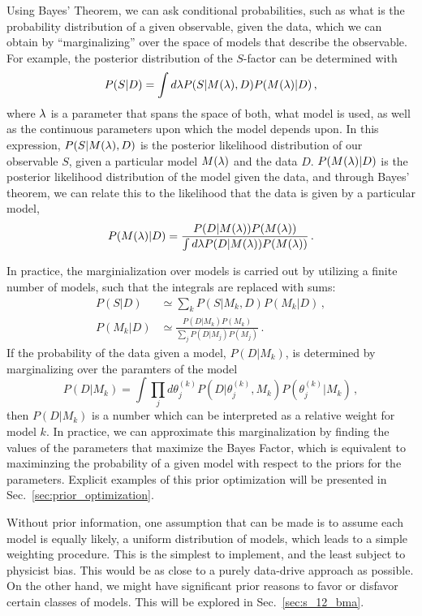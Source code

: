 \documentclass[prd,11pt,superscriptaddress,notitlepage,tightenlines,nofootinbib,floatfix]{revtex4-1}
\begin{document}
Using Bayes' Theorem, we can ask conditional probabilities, such as what is the probability distribution of a given observable, given the data, which we can obtain by ``marginalizing'' over the space of models that describe the observable.  For example, the posterior distribution of the $S$-factor can be determined with 
\begin{equation}
P(S | D) = \int d{\lambda} P(S | M({\lambda}), D) P(M({\lambda}) | D)\, ,
\end{equation}
where ${\lambda}$ is a parameter that spans the space of both, what model is used, as well as the continuous parameters upon which the model depends upon.
In this expression, $P(S | M({\lambda}), D)$ is the posterior likelihood distribution of our observable $S$, given a particular model $M({\lambda})$ and the data $D$.
$P(M({\lambda}) | D)$ is the posterior likelihood distribution of the model given the data, and through Bayes' theorem, we can relate this to the likelihood that the data is given by a particular model, 
\begin{equation}
P(M({\lambda})|D) = \frac{P(D|M({\lambda})) P(M({\lambda}))}{\int d{\lambda} P(D|M({\lambda}))P(M({\lambda}))}\, .
\end{equation}

In practice, the marginialization over models is carried out by utilizing a finite number of models, such that the integrals are replaced with sums:
\begin{align}
P(S|D) &\simeq \sum_k P(S|M_k, D) P(M_k|D)\, ,
\nonumber\\
P(M_k|D) &\simeq \frac{P(D|M_k) P(M_k)}{\sum_j P(D|M_j) P(M_j)}\, .
\end{align}
If the probability of the data given a model, $P(D|M_k)$, is determined by marginalizing over the paramters of the model
\begin{equation}
P(D|M_k) = \int \prod_j d\theta_j^{(k)} P(D|\theta_j^{(k)}, M_k) P(\theta_j^{(k)}|M_k)\, ,
\end{equation}
then $P(D|M_k)$ is a number which can be interpreted as a relative weight for model $k$.
In practice, we can approximate this marginalization by finding the values of the parameters that maximize the Bayes Factor, which is equivalent to maximinzing the probability of a given model with respect to the priors for the parameters.  Explicit examples of this prior optimization will be presented in Sec.~\ref{sec:prior_optimization}.

Without prior information, one assumption that can be made is to assume each model is equally likely, a uniform distribution of models, which leads to a simple weighting procedure.  This is the simplest to implement, and the least subject to physicist bias.  This would be as close to a purely data-drive approach as possible.  On the other hand, we might have significant prior reasons to favor or disfavor certain classes of models.  This will be explored in Sec.~\ref{sec:s_12_bma}.
\end{document}
